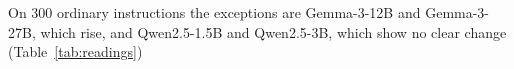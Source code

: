 On $300$ ordinary instructions the exceptions are Gemma-3-12B and Gemma-3-27B, which rise, and Qwen2.5-1.5B and Qwen2.5-3B, which show no clear change (Table~\ref{tab:readings})